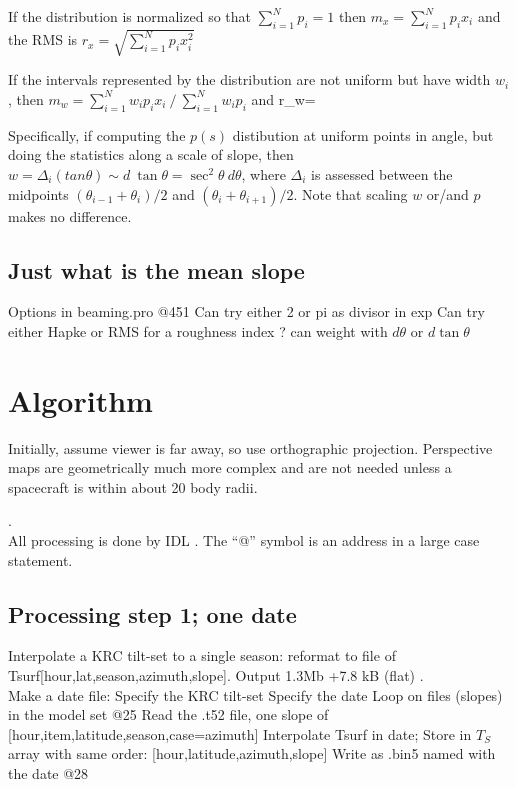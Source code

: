 \documentclass{article}
\begin{document}
If the distribution is normalized so that $\sum_{i=1}^N p_i =1$ 
 then  $ m_x=\sum_{i=1}^N p_i x_i $
 and the RMS is $ r_x=\sqrt{ \sum_{i=1}^N p_i x^2_i }$

\vspace{4.mm}

If the intervals represented by the distribution are not uniform but have width $w_i$, 
\qii then $ m_w=\sum_{i=1}^N w_ip_ix_i \ \big/ \ \sum_{i=1}^N w_ip_i$ and 
\qb r_w= \qe


Specifically, if computing the $p(s)$ distibution at uniform points in angle,
but doing the statistics along a scale of slope, then $w= \Delta_i (tan \theta)
\sim d \ \tan \theta = \sec ^2 \theta \ d \theta $, where $\Delta_i$ is assessed
between the midpoints $(\theta_{i-1}+ \theta_i )/2 $ and $(\theta_i +
\theta_{i+1} )/2 $. Note that scaling $w$ or/and $p$ makes no difference.

\subsection{Just what is the mean slope}
Options in beaming.pro @451
\qi Can try either 2 or pi as divisor in exp
\qi Can try either Hapke or RMS for a roughness index
\qi ? can weight with $d \theta$ or  $d \tan \theta$


\section{Algorithm} 

Initially, assume viewer is far away, so use orthographic
projection. Perspective maps are geometrically much more complex and are not
needed unless a spacecraft is within about 20 body radii.

.
\\ All processing is done by IDL . The ``@'' symbol is an address in a large case statement.

\subsection{Processing step 1; one date \label{s1}} 
Interpolate a KRC tilt-set to a single season: reformat to file of
Tsurf[hour,lat,season,azimuth,slope].  Output 1.3Mb +7.8 kB (flat)
.
\\ Make a date file:
\qi Specify the KRC tilt-set
\qi Specify the date
\qii Loop on files (slopes) in the model set  @25
\qii Read the .t52 file, one slope of [hour,item,latitude,season,case=azimuth]
\qiii Interpolate Tsurf in date;
\qiii Store in $T_S$ array with same order: [hour,latitude,azimuth,slope] 
\qii Write as .bin5 named with the date  @28
\end{document}
